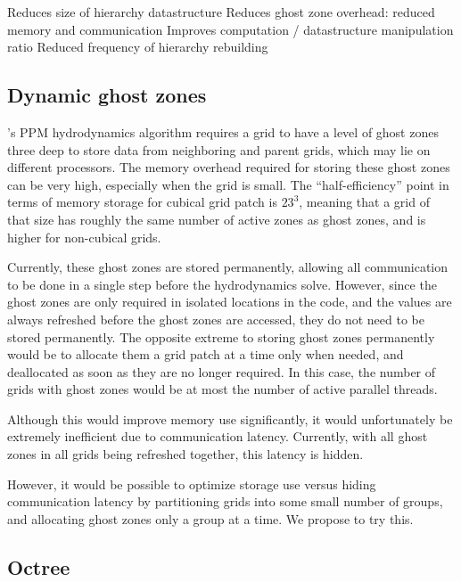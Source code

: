 \documentclass{article}
\begin{document}
   Reduces size of hierarchy datastructure
   Reduces ghost zone overhead: reduced memory and communication
   Improves computation / datastructure manipulation ratio
   Reduced frequency of hierarchy rebuilding
\subsection{Dynamic ghost zones} \label{solution:amr-dynamic-ghosts}

  \enzo's PPM hydrodynamics algorithm requires a grid to have a level
  of ghost zones three deep to store data from neighboring and parent
  grids, which may lie on different processors.  The memory overhead
  required for storing these ghost zones can be very high, especially
  when the grid is small.  The ``half-efficiency'' point in terms of
  memory storage for cubical grid patch is $23^3$, meaning that a grid
  of that size has roughly the same number of active zones as ghost
  zones, and is higher for non-cubical grids.

  Currently, these ghost zones are stored permanently, allowing all
  communication to be done in a single step before the hydrodynamics
  solve.  However, since the ghost zones are only required in isolated
  locations in the code, and the values are always refreshed before
  the ghost zones are accessed, they do not need to be stored
  permanently.  The opposite extreme to storing ghost zones
  permanently would be to allocate them a grid patch at a time only
  when needed, and deallocated as soon as they are no longer required.
  In this case, the number of grids with ghost zones would be at most
  the number of active parallel threads.

  Although this would improve memory use significantly, it would
  unfortunately be extremely inefficient due to communication latency.
  Currently, with all ghost zones in all grids being refreshed
  together, this latency is hidden.

  However, it would be possible to optimize storage use versus hiding
  communication latency by partitioning grids into some small number
  of groups, and allocating ghost zones only a group at a time.  We
  propose to try this.

\subsection{Octree} \label{solution:amr-octree}
\end{document}

